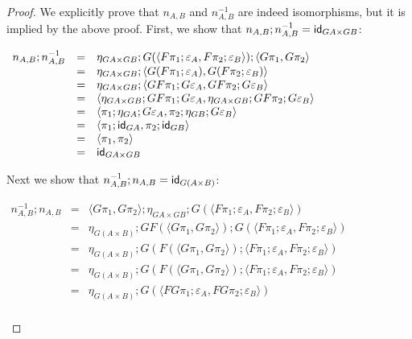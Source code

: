 \begin{proof}
  We explicitly prove that $n_{A,B}$ and $n^{-1}_{A,B}$ are indeed
  isomorphisms, but it is implied by the above proof.  First, we show
  that $n_{A,B};n^{-1}_{A,B} = \mathsf{id}_{GA \times GB}$:
  \begin{center}
    \begin{math}
      \begin{array}{lll}
        n_{A,B};n^{-1}_{A,B}
        & = & \eta_{GA \times GB};G(\langle F\pi_1;\varepsilon_A, F\pi_2;\varepsilon_B \rangle);\langle G\pi_1, G\pi_2\rangle\\
        & = & \eta_{GA \times GB};\langle G(F\pi_1;\varepsilon_A), G(F\pi_2;\varepsilon_B)\rangle\\
        & = & \eta_{GA \times GB};\langle GF\pi_1;G\varepsilon_A, GF\pi_2;G\varepsilon_B\rangle\\
        & = & \langle \eta_{GA \times GB};GF\pi_1;G\varepsilon_A, \eta_{GA \times GB};GF\pi_2;G\varepsilon_B\rangle\\
        & = & \langle \pi_1;\eta_{GA};G\varepsilon_A, \pi_2;\eta_{GB};G\varepsilon_B\rangle\\
        & = & \langle \pi_1;\mathsf{id}_{GA}, \pi_2;\mathsf{id}_{GB}\rangle\\
        & = & \langle \pi_1, \pi_2\rangle\\
        & = & \mathsf{id}_{GA \times GB}
      \end{array}
    \end{math}
  \end{center}
  Next we show that $n^{-1}_{A,B};n_{A,B} = \mathsf{id}_{G(A \times B)}$:
  \begin{center}
    \begin{math}
      \begin{array}{lll}
        n^{-1}_{A,B};n_{A,B}
        & = & \langle G\pi_1, G\pi_2\rangle;\eta_{GA \times GB};G(\langle F\pi_1;\varepsilon_A, F\pi_2;\varepsilon_B \rangle)\\
        & = & \eta_{G(A \times B)};GF(\langle G\pi_1, G\pi_2\rangle);G(\langle F\pi_1;\varepsilon_A, F\pi_2;\varepsilon_B \rangle)\\
        & = & \eta_{G(A \times B)};G(F(\langle G\pi_1, G\pi_2\rangle);\langle F\pi_1;\varepsilon_A, F\pi_2;\varepsilon_B \rangle)\\
        & = & \eta_{G(A \times B)};G(F(\langle G\pi_1, G\pi_2\rangle);\langle F\pi_1;\varepsilon_A, F\pi_2;\varepsilon_B \rangle)\\
        & = & \eta_{G(A \times B)};G(\langle FG\pi_1;\varepsilon_A, FG\pi_2;\varepsilon_B \rangle)\\

\end{array}
\end{math}
\end{center}
\end{proof}
